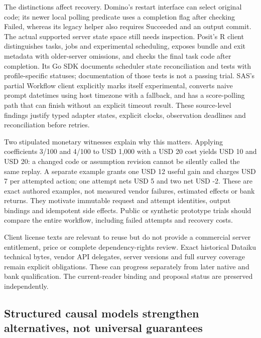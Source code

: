 The distinctions affect recovery. Domino's restart interface can select
original code; its newer local polling predicate uses a completion flag
after checking Failed, whereas its legacy helper also requires Succeeded
and an output commit. The actual supported server state space still
needs inspection. Posit's R client distinguishes tasks, jobs and
experimental scheduling, exposes bundle and exit metadata with
older-server omissions, and checks the final task code after completion.
Its Go SDK documents scheduler state reconciliation and tests with
profile-specific statuses; documentation of those tests is not a passing
trial. SAS's partial Workflow client explicitly marks itself
experimental, converts naive prompt datetimes using host timezone with a
fallback, and has a score-polling path that can finish without an
explicit timeout result. These source-level findings justify typed
adapter states, explicit clocks, observation deadlines and
reconciliation before retries.
\citep{exec23_workflow_dominopy,exec23_workflow_connectapi,exec23_workflow_positgo,exec23_workflow_sasctl}

Two stipulated monetary witnesses explain why this matters. Applying
coefficients 3/100 and 4/100 to USD 1,000 with a USD 20 cost yields USD
10 and USD 20: a changed code or assumption revision cannot be silently
called the same replay. A separate example grants one USD 12 useful gain
and charges USD 7 per attempted action; one attempt nets USD 5 and two
net USD -2. These are exact authored examples, not measured vendor
failures, estimated effects or bank returns. They motivate immutable
request and attempt identities, output bindings and idempotent side
effects. Public or synthetic prototype trials should compare the entire
workflow, including failed attempts and recovery costs.
\citep{exec23_workflow_client_reference}

Client license texts are relevant to reuse but do not provide a
commercial server entitlement, price or complete dependency-rights
review. Exact historical Dataiku technical bytes, vendor API delegates,
server versions and full survey coverage remain explicit obligations.
These can progress separately from later native and bank qualification.
The current-reader binding and proposal status are preserved
independently. \citep{sp23wc_reader,sp23wc_progress}

\hypertarget{structured-causal-models-strengthen-alternatives-not-universal-guarantees}{%
\subsection{Structured causal models strengthen alternatives, not
universal
guarantees}\label{structured-causal-models-strengthen-alternatives-not-universal-guarantees}}

